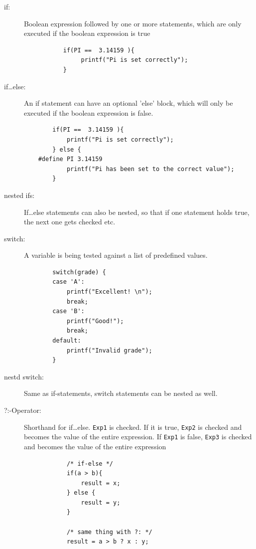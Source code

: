 \documentclass[a4paper, 11pt]{article}
\newcommand{\code}[1]{\texttt{#1}}
\begin{document}
\begin{description}
    \item[if: ] Boolean expression followed by one or more statements, which are only executed if the boolean expression is true \\
        \begin{verbatim}
           if(PI ==  3.14159 ){
                printf("Pi is set correctly");
           }
        \end{verbatim}
    \item[if\ldots else: ] An if statement can have an optional 'else' block, which will only be executed if the boolean expression is false. \\
        \begin{verbatim}
        if(PI ==  3.14159 ){
            printf("Pi is set correctly");
        } else {
    #define PI 3.14159
            printf("Pi has been set to the correct value");
        }
        \end{verbatim}
    \item[nested ifs: ] If\ldots else statements can also be nested, so that if one statement holds true, the next one gets checked etc.
    \item[switch: ] A variable is being tested against a list of predefined values. \\
        \begin{verbatim}
        switch(grade) {
        case 'A':
            printf("Excellent! \n");
            break;
        case 'B':
            printf("Good!");
            break;
        default:
            printf("Invalid grade");
        }
        \end{verbatim}
    \item[nestd switch: ] Same as if-statements, switch statements can be nested as well.
    \item[?:-Operator: ] Shorthand for if\ldots else. \code{Exp1} is checked. If it is true, \code{Exp2} is checked and becomes the value of the entire expression. If \code{Exp1} is false, \code{Exp3} is checked and becomes the value of the entire expression \\
        \begin{verbatim}
            /* if-else */
            if(a > b){
                result = x;
            } else {
                result = y;
            }

            /* same thing with ?: */
            result = a > b ? x : y;
       \end{verbatim}
\end{description}
\end{document}

